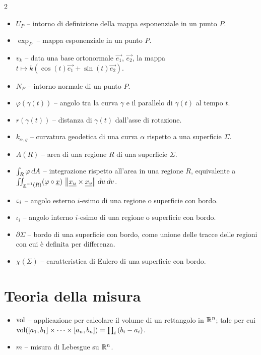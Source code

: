 \begin{multicols*}{2}
\begin{itemize}
            \item $U_P$ -- intorno di definizione della mappa esponenziale in un punto $P$.
            \item $\exp_P$ -- mappa esponenziale in un punto $P$.
            \item $v_k$ -- data una base ortonormale $\vec{e_1}$, $\vec{e_2}$, la mappa $t \mapsto k(\cos(t) \vec{e_1} + \sin(t) \vec{e_2})$.
            \item $N_P$ -- intorno normale di un punto $P$.
            \item $\varphi(\gamma(t))$ -- angolo tra la curva $\gamma$ e il parallelo di $\gamma(t)$ al tempo $t$.
            \item $r(\gamma(t))$ -- distanza di $\gamma(t)$ dall'asse di rotazione.
            \item $k_{\alpha, g}$ -- curvatura geodetica di una curva $\alpha$ rispetto a una superficie $\Sigma$.
            \item $A(R)$ -- area di una regione $R$ di una superficie $\Sigma$.
            \item $\int_R \varphi \dA$ -- integrazione rispetto all'area in una regione $R$, equivalente a $\iint_{\vec{x}\inv(R)} (\varphi \circ \vec{x}) \, \norm{\vec{x_u} \times \vec{x_v}} \du \dv$.
            \item $\varepsilon_i$ -- angolo esterno $i$-esimo di una regione o superficie con bordo.
            \item $\iota_i$ -- angolo interno $i$-esimo di una regione o superficie con bordo.
            \item $\partial \Sigma$ -- bordo di una superficie con bordo, come unione delle tracce delle regioni con cui è definita per differenza.
            \item $\chi(\Sigma)$ -- caratteristica di Eulero di una superficie con bordo.
      \end{itemize}

      \section*{Teoria della misura}

      \begin{itemize}
            \item $\operatorname{vol}$ -- applicazione per calcolare il volume di un rettangolo in $\mathbb{R}^n$; tale per cui
                  $\operatorname{vol}([a_1, b_1] \times \cdots \times [a_n, b_n]) = \prod_i {(b_i - a_i)}$.
            \item $m$ -- misura di Lebesgue su $\mathbb{R}^n$.
      \end{itemize}


\end{multicols*}
